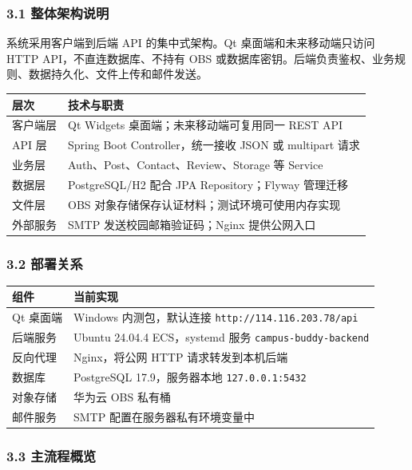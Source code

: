 \documentclass[
]{ctexart}
\begin{document}
\hypertarget{ux6574ux4f53ux67b6ux6784ux8bf4ux660e}{%
\subsubsection{3.1
整体架构说明}\label{ux6574ux4f53ux67b6ux6784ux8bf4ux660e}}

系统采用客户端到后端 API 的集中式架构。Qt 桌面端和未来移动端只访问 HTTP
API，不直连数据库、不持有 OBS
或数据库密钥。后端负责鉴权、业务规则、数据持久化、文件上传和邮件发送。

\begin{longtable}[]{@{}ll@{}}
\toprule
层次 & 技术与职责 \\
\midrule
\endhead
客户端层 & Qt Widgets 桌面端；未来移动端可复用同一 REST API \\
API 层 & Spring Boot Controller，统一接收 JSON 或 multipart 请求 \\
业务层 & Auth、Post、Contact、Review、Storage 等 Service \\
数据层 & PostgreSQL/H2 配合 JPA Repository；Flyway 管理迁移 \\
文件层 & OBS 对象存储保存认证材料；测试环境可使用内存实现 \\
外部服务 & SMTP 发送校园邮箱验证码；Nginx 提供公网入口 \\
\bottomrule
\end{longtable}

\hypertarget{ux90e8ux7f72ux5173ux7cfb}{%
\subsubsection{3.2 部署关系}\label{ux90e8ux7f72ux5173ux7cfb}}

\begin{longtable}[]{@{}ll@{}}
\toprule
组件 & 当前实现 \\
\midrule
\endhead
Qt 桌面端 & Windows 内测包，默认连接
\texttt{http://114.116.203.78/api} \\
后端服务 & Ubuntu 24.04.4 ECS，systemd 服务
\texttt{campus-buddy-backend} \\
反向代理 & Nginx，将公网 HTTP 请求转发到本机后端 \\
数据库 & PostgreSQL 17.9，服务器本地 \texttt{127.0.0.1:5432} \\
对象存储 & 华为云 OBS 私有桶 \\
邮件服务 & SMTP 配置在服务器私有环境变量中 \\
\bottomrule
\end{longtable}

\hypertarget{ux4e3bux6d41ux7a0bux6982ux89c8}{%
\subsubsection{3.3 主流程概览}\label{ux4e3bux6d41ux7a0bux6982ux89c8}}
\end{document}
